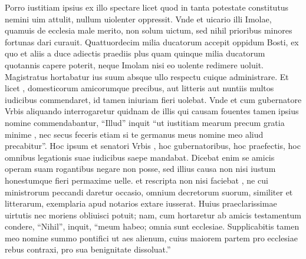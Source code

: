 \documentclass[a5paper,twoside]{article}
\begin{document}
\begin{pages}
\begin{Leftside}
Porro iustitiam ipsius ex illo spectare licet quod in tanta  potestate constitutus nemini uim attulit, nullum uiolenter oppressit. Vnde et uicario illi Imolae, quamuis de ecclesia male merito, non solum uictum, sed nihil prioribus minores fortunas dari curauit. Quattuordecim  milia ducatorum accepit   oppidum Bosti, ex quo et aliis a duce adiectis praediis plus quam quinque milia ducatorum quotannis capere poterit, neque Imolam nisi eo uolente redimere uoluit. Magistratus hortabatur ius suum absque ullo respectu cuique administrare. Et licet , domesticorum amicorumque  precibus, aut litteris aut nuntiis multos iudicibus commendaret, id tamen   iniuriam fieri uolebat. Vnde et cum  gubernatore Vrbis aliquando interrogaretur quidnam de illis  qui  causam fouentes tamen ipsius nomine commendabantur, ``Illud'' inquit ``ut iustitiam mearum precum gratia minime , nec secus feceris etiam si te germanus meus  nomine meo aliud precabitur''.  Hoc ipsum et senatori Vrbis , hoc gubernatoribus, hoc praefectis, hoc omnibus legationis suae iudicibus saepe mandabat.  Dicebat enim se amicis operam suam rogantibus negare non posse, sed illius causa non nisi iustum honestumque fieri permaxime uelle.   et rescripta non nisi  faciebat , ne cui ministrorum peccandi daretur occasio, omnium decretorum suorum, similiter et litterarum, exemplaria apud notarios extare iusserat.  Huius praeclarissimae uirtutis nec moriens obliuisci potuit; nam, cum hortaretur ab amicis testamentum condere, ``Nihil'', inquit, ``meum habeo; omnia sunt ecclesiae. Supplicabitis tamen meo nomine summo pontifici ut aes alienum, cuius maiorem partem pro  ecclesiae rebus contraxi, pro sua benignitate dissoluat.''

\end{Leftside}
\end{pages}
\end{document}
